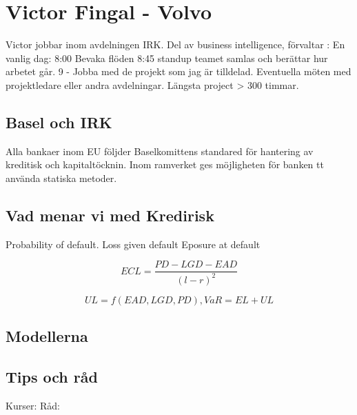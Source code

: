 \chapter{Victor Fingal - Volvo}
	Victor jobbar inom avdelningen IRK. Del av business intelligence, förvaltar :
	En vanlig dag:
	8:00 Bevaka flöden
	8:45 standup teamet samlas och berättar hur arbetet går.
	9 - Jobba med de projekt som jag är tilldelad.
	Eventuella möten med projektledare eller andra avdelningar.
	Längsta project > 300 timmar.
	\section{Basel och IRK}
	Alla bankaer inom EU följder Baselkomittens standared för hantering av kreditisk och kapitaltöcknin.
	Inom ramverket ges möjligheten för banken tt använda statiska metoder.
	\section{Vad menar vi med Kredirisk}
	Probability of default.
	Loss given default
	Eposure at default
	
	$$ECL =\frac{PD - LGD - EAD}{{(l-r)}^2}$$
	
	$$UL = f(EAD,LGD,PD),VaR=EL+UL$$
	
	\section{Modellerna}
	\section{Tips och råd}
	Kurser:
Råd:

